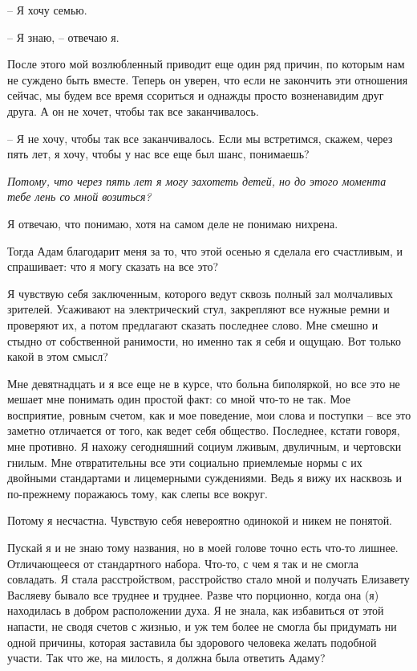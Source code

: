 \documentclass[
]{book}
\begin{document}
-- Я хочу семью.

-- Я знаю, -- отвечаю я.

После этого мой возлюбленный приводит еще один ряд причин, по которым нам не суждено быть вместе. Теперь он уверен, что если не закончить эти отношения сейчас, мы будем все время ссориться и однажды просто возненавидим друг друга. А он не хочет, чтобы так все заканчивалось.

-- Я не хочу, чтобы так все заканчивалось. Если мы встретимся, скажем, через пять лет, я хочу, чтобы у нас все еще был шанс, понимаешь?

\emph{Потому, что через пять лет я могу захотеть детей, но до этого момента тебе лень со мной возиться?}

Я отвечаю, что понимаю, хотя на самом деле не понимаю нихрена.

Тогда Адам благодарит меня за то, что этой осенью я сделала его счастливым, и спрашивает: что я могу сказать на все это?

Я чувствую себя заключенным, которого ведут сквозь полный зал молчаливых зрителей. Усаживают на электрический стул, закрепляют все нужные ремни и проверяют их, а потом предлагают сказать последнее слово. Мне смешно и стыдно от собственной ранимости, но именно так я себя и ощущаю. Вот только какой в этом смысл?

Мне девятнадцать и я все еще не в курсе, что больна биполяркой, но все это не мешает мне понимать один простой факт: со мной что-то не так. Мое восприятие, ровным счетом, как и мое поведение, мои слова и поступки -- все это заметно отличается от того, как ведет себя общество. Последнее, кстати говоря, мне противно. Я нахожу сегодняшний социум лживым, двуличным, и чертовски гнилым. Мне отвратительны все эти социально приемлемые нормы с их двойными стандартами и лицемерными суждениями. Ведь я вижу их насквозь и по-прежнему поражаюсь тому, как слепы все вокруг.

Потому я несчастна. Чувствую себя невероятно одинокой и никем не понятой.

Пускай я и не знаю тому названия, но в моей голове точно есть что-то лишнее. Отличающееся от стандартного набора. Что-то, с чем я так и не смогла совладать. Я стала расстройством, расстройство стало мной и получать Елизавету Васляеву бывало все труднее и труднее. Разве что порционно, когда она (я) находилась в добром расположении духа. Я не знала, как избавиться от этой напасти, не сводя счетов с жизнью, и уж тем более не смогла бы придумать ни одной причины, которая заставила бы здорового человека желать подобной участи. Так что же, на милость, я должна была ответить Адаму?
\end{document}
